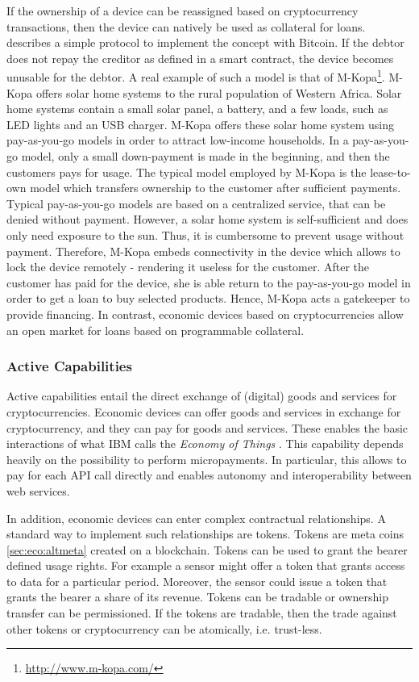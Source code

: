 If the ownership of a device can be reassigned based on cryptocurrency transactions, then the device can natively be used as collateral for loans. \cite{smartproperty2011} describes a simple protocol to implement the concept with Bitcoin. If the debtor does not repay the creditor as defined in a smart contract, the device becomes unusable for the debtor. A real example of such a model is that of M-Kopa\footnote{\url{http://www.m-kopa.com/}}. M-Kopa offers solar home systems to the rural population of Western Africa. Solar home systems contain a small solar panel, a battery, and a few loads, such as LED lights and an USB charger. M-Kopa offers these solar home system using pay-as-you-go models in order to attract low-income households. In a pay-as-you-go model, only a small down-payment is made in the beginning, and then the customers pays for usage. The typical model employed by M-Kopa is the lease-to-own model which transfers ownership to the customer after sufficient payments. Typical pay-as-you-go models are based on a centralized service, that can be denied without payment. However, a solar home system is self-sufficient and does only need exposure to the sun. Thus, it is cumbersome to prevent usage without payment. Therefore, M-Kopa embeds connectivity in the device which allows to lock the device remotely - rendering it useless for the customer. After the customer has paid for the device, she is able return to the pay-as-you-go model in order to get a loan to buy selected products. Hence, M-Kopa acts a gatekeeper to provide financing. In contrast, economic devices based on cryptocurrencies allow an open market for loans based on programmable collateral.

\subsubsection{Active Capabilities}

Active capabilities entail the direct exchange of (digital) goods and services for cryptocurrencies. Economic devices can offer goods and services in exchange for cryptocurrency, and they can pay for goods and services. These enables the basic interactions of what IBM calls the \emph{Economy of Things} \parencite{Pureswaran2015}. This capability depends heavily on the possibility to perform micropayments. In particular, this allows to pay for each \ac{API} call directly and enables autonomy and interoperability between web services. 

In addition, economic devices can enter complex contractual relationships. A standard way to implement such relationships are tokens. Tokens are meta coins \ref{sec:eco:altmeta} created on a blockchain. Tokens can be used to grant the bearer defined usage rights. For example a sensor might offer a token that grants access to data for a particular period. Moreover, the sensor could issue a token that grants the bearer a share of its revenue. Tokens can be tradable or ownership transfer can be permissioned. If the tokens are tradable, then the trade against other tokens or cryptocurrency can be atomically, i.e. trust-less.

